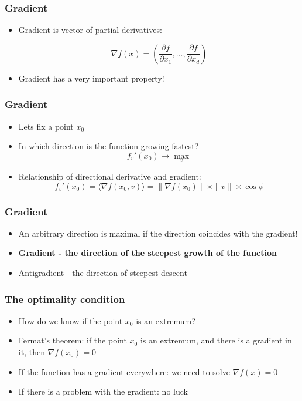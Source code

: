 \documentclass[default]{beamer}
\begin{document}
	\begin{frame}
		\frametitle{Gradient}
		
		\Large
		\begin{itemize}
			\item Gradient is vector of partial derivatives:
			
			\[
			\nabla f(x)=\left(\frac{\partial f}{\partial x_1},\dots,\frac{\partial f}{\partial x_d} \right)
			\]
			\item Gradient has a very important property!
		\end{itemize}
		
	\end{frame}
		
	\begin{frame}
		\frametitle{Gradient}
		
		\Large
		\begin{itemize}
			\item Lets fix a point $x_0$
			\item In which direction is the function growing fastest?
			\[
				f_v'(x_0)\rightarrow \max_v
			\]
			\item Relationship of directional derivative and gradient:
			\[
				f_v'(x_0)=\langle \nabla f (x_0,v)\rangle=\|\nabla f(x_0)\|\times \|v\|\times \cos\phi
			\]
		\end{itemize}
		
	\end{frame}

	\begin{frame}
		\frametitle{Gradient}
		
		\Large
		\begin{itemize}
			\item An arbitrary direction is maximal if the direction coincides with the gradient!
			\item \textbf{Gradient - the direction of the steepest growth of the function}
			\item Antigradient - the direction of steepest descent
		\end{itemize}
		
		\end{frame}


	
	\begin{frame}
		\frametitle{The optimality condition}
		
		\begin{itemize}
			\item How do we know if the point $x_0$ is an extremum?
			\item Fermat's theorem: if the point $x_0$ is an extremum, and there is a gradient in it, then $\nabla f(x_0) = 0$
			\item If the function has a gradient everywhere: we need to solve $\nabla f(x) = 0$
			\item If there is a problem with the gradient: no luck
		\end{itemize}
	\end{frame}
\end{document}
